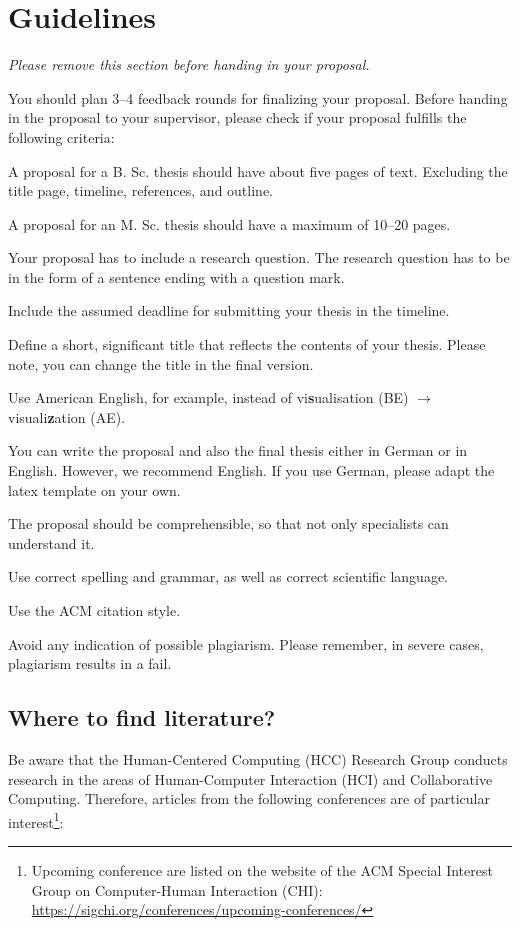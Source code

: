 \pagecolor{fu-orange}

\section*{Guidelines}
\emph{Please remove this section before handing in your proposal.}

You should plan 3--4 feedback rounds for finalizing your proposal.
Before handing in the proposal to your supervisor, please check if your proposal fulfills the following criteria:

\begin{todolist}
  \item A proposal for a B. Sc. thesis should have about five pages of text. Excluding the title page, timeline, references, and outline.
  \item A proposal for an M. Sc. thesis should have a maximum of 10--20 pages.
  \item Your proposal has to include a research question. The research question has to be in the form of a sentence ending with a question mark.
  \item Include the assumed deadline for submitting your thesis in the timeline.
  \item Define a short, significant title that reflects the contents of your thesis. Please note, you can change the title in the final version.
  \item Use American English, for example, instead of vi\textbf{s}ualisation (BE) $\rightarrow$ visuali\textbf{z}ation (AE).
  \item You can write the proposal and also the final thesis either in German or in English. However, we recommend English. If you use German, please adapt the latex template on your own.
  \item The proposal should be comprehensible, so that not only specialists can understand it.
  \item Use correct spelling and grammar, as well as correct scientific language.
  \item Use the ACM citation style.
  \item Avoid any indication of possible plagiarism. Please remember, in severe cases, plagiarism results in a fail.
 
\end{todolist}

\subsection*{Where to find literature?}
Be aware that the Human-Centered Computing (HCC) Research Group conducts research in the areas of Human-Computer Interaction (HCI) and Collaborative Computing. Therefore, articles from the following conferences are of particular interest\footnote{Upcoming conference are listed on the website of the ACM Special Interest Group on Computer-Human Interaction (CHI): \url{https://sigchi.org/conferences/upcoming-conferences/}}: 

